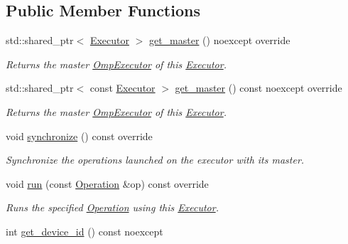 \subsection*{Public Member Functions}
\begin{DoxyCompactItemize}
\item 
std\+::shared\+\_\+ptr$<$ \hyperlink{classgko_1_1Executor}{Executor} $>$ \hyperlink{classgko_1_1CudaExecutor_a59a618e0d48b42fe699e9d4cf347b491}{get\+\_\+master} () noexcept override
\begin{DoxyCompactList}\small\item\em Returns the master \hyperlink{classgko_1_1OmpExecutor}{Omp\+Executor} of this \hyperlink{classgko_1_1Executor}{Executor}. \end{DoxyCompactList}\item 
std\+::shared\+\_\+ptr$<$ const \hyperlink{classgko_1_1Executor}{Executor} $>$ \hyperlink{classgko_1_1CudaExecutor_a75295b3424224f907958abfa95c66298}{get\+\_\+master} () const noexcept override
\begin{DoxyCompactList}\small\item\em Returns the master \hyperlink{classgko_1_1OmpExecutor}{Omp\+Executor} of this \hyperlink{classgko_1_1Executor}{Executor}. \end{DoxyCompactList}\item 
\mbox{\label{classgko_1_1CudaExecutor_a903cf7e3460b14677c0bce5ca08a1b81}} 
void \hyperlink{classgko_1_1CudaExecutor_a903cf7e3460b14677c0bce5ca08a1b81}{synchronize} () const override
\begin{DoxyCompactList}\small\item\em Synchronize the operations launched on the executor with its master. \end{DoxyCompactList}\item 
void \hyperlink{classgko_1_1CudaExecutor_a32a73a74403376d774933abf9663d59e}{run} (const \hyperlink{classgko_1_1Operation}{Operation} \&op) const override
\begin{DoxyCompactList}\small\item\em Runs the specified \hyperlink{classgko_1_1Operation}{Operation} using this \hyperlink{classgko_1_1Executor}{Executor}. \end{DoxyCompactList}\item 
\mbox{\label{classgko_1_1CudaExecutor_a7cfa915eadd2329eb897dc1ee2712488}} 
int \hyperlink{classgko_1_1CudaExecutor_a7cfa915eadd2329eb897dc1ee2712488}{get\+\_\+device\+\_\+id} () const noexcept

\end{DoxyCompactItemize}
